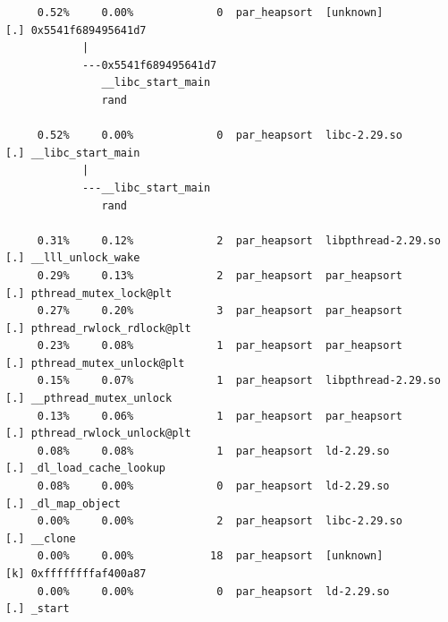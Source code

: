 \documentclass{article}
\begin{document}
\begin{verbatim}
     0.52%     0.00%             0  par_heapsort  [unknown]           [.] 0x5541f689495641d7
            |
            ---0x5541f689495641d7
               __libc_start_main
               rand

     0.52%     0.00%             0  par_heapsort  libc-2.29.so        [.] __libc_start_main
            |
            ---__libc_start_main
               rand

     0.31%     0.12%             2  par_heapsort  libpthread-2.29.so  [.] __lll_unlock_wake
     0.29%     0.13%             2  par_heapsort  par_heapsort        [.] pthread_mutex_lock@plt
     0.27%     0.20%             3  par_heapsort  par_heapsort        [.] pthread_rwlock_rdlock@plt
     0.23%     0.08%             1  par_heapsort  par_heapsort        [.] pthread_mutex_unlock@plt
     0.15%     0.07%             1  par_heapsort  libpthread-2.29.so  [.] __pthread_mutex_unlock
     0.13%     0.06%             1  par_heapsort  par_heapsort        [.] pthread_rwlock_unlock@plt
     0.08%     0.08%             1  par_heapsort  ld-2.29.so          [.] _dl_load_cache_lookup
     0.08%     0.00%             0  par_heapsort  ld-2.29.so          [.] _dl_map_object
     0.00%     0.00%             2  par_heapsort  libc-2.29.so        [.] __clone
     0.00%     0.00%            18  par_heapsort  [unknown]           [k] 0xffffffffaf400a87
     0.00%     0.00%             0  par_heapsort  ld-2.29.so          [.] _start
\end{verbatim}
\normalsize
\end{document}
